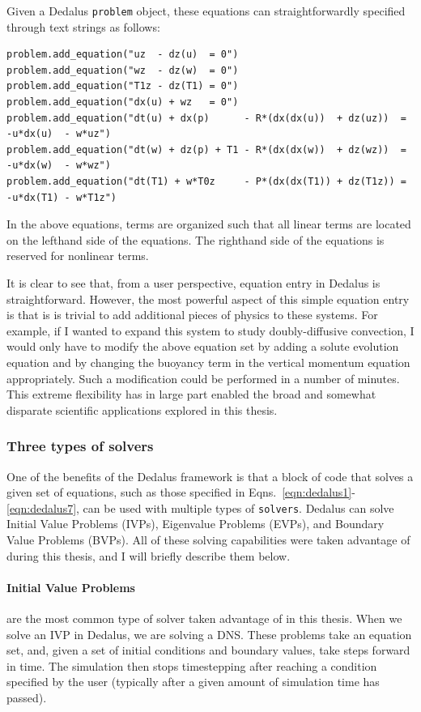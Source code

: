 Given a Dedalus \texttt{problem} object, these equations can straightforwardly specified through text strings as follows:
\begingroup
	\fontsize{9.7pt}{9pt}\selectfont
	\begin{verbatim}
problem.add_equation("uz  - dz(u)  = 0")
problem.add_equation("wz  - dz(w)  = 0")
problem.add_equation("T1z - dz(T1) = 0")
problem.add_equation("dx(u) + wz   = 0")
problem.add_equation("dt(u) + dx(p)      - R*(dx(dx(u))  + dz(uz))  = -u*dx(u)  - w*uz")
problem.add_equation("dt(w) + dz(p) + T1 - R*(dx(dx(w))  + dz(wz))  = -u*dx(w)  - w*wz")
problem.add_equation("dt(T1) + w*T0z     - P*(dx(dx(T1)) + dz(T1z)) = -u*dx(T1) - w*T1z")
	\end{verbatim}
\endgroup
In the above equations, terms are organized such that all linear terms are located on the lefthand side of the equations.
The righthand side of the equations is reserved for nonlinear terms.

It is clear to see that, from a user perspective, equation entry in Dedalus is straightforward.
However, the most powerful aspect of this simple equation entry is that is is trivial to add additional pieces of physics to these systems.
For example, if I wanted to expand this system to study doubly-diffusive convection, I would only have to modify the above equation set by adding a solute evolution equation and by changing the buoyancy term in the vertical momentum equation appropriately.
Such a modification could be performed in a number of minutes.
This extreme flexibility has in large part enabled the broad and somewhat disparate scientific applications explored in this thesis.

\subsubsection{Three types of solvers}
One of the benefits of the Dedalus framework is that a block of code that solves a given set of equations, such as those specified in Eqns.~\ref{eqn:dedalus1}-\ref{eqn:dedalus7}, can be used with multiple types of \texttt{solvers}.
Dedalus can solve Initial Value Problems (IVPs), Eigenvalue Problems (EVPs), and Boundary Value Problems (BVPs).
All of these solving capabilities were taken advantage of during this thesis, and I will briefly describe them below.

\paragraph{Initial Value Problems} are the most common type of solver taken advantage of in this thesis.
When we solve an IVP in Dedalus, we are solving a DNS.
These problems take an equation set, and, given a set of initial conditions and boundary values, take steps forward in time.
The simulation then stops timestepping after reaching a condition specified by the user (typically after a given amount of simulation time has passed).

